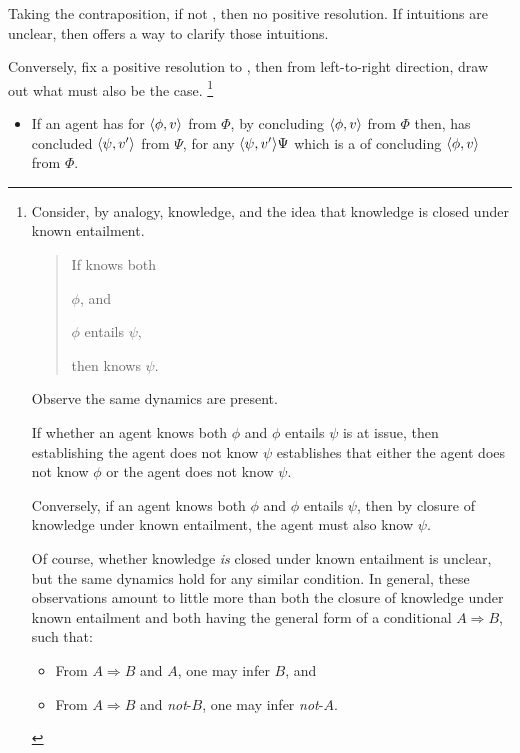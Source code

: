 \begin{note}
  Taking the contraposition, if not \iCS{}, then no positive resolution.
  If intuitions are unclear, then \iCS{} offers a way to clarify those intuitions.

  Conversely, fix a positive resolution to \qzs{}, then from left-to-right direction, draw out what must also be the case.%
  \footnote{
    Consider, by analogy, knowledge, and the idea that knowledge is closed under known entailment.
    \begin{quote}
      If \vAgent{} knows both
      \begin{enumerate*}[label=(\roman*)]
      \item \(\phi\), and
      \item \(\phi\) entails \(\psi\),
      \end{enumerate*}
      then \vAgent{} knows \(\psi\).
    \end{quote}
    Observe the same dynamics are present.

    If whether an agent knows both \(\phi\) and \(\phi\) entails \(\psi\) is at issue, then establishing the agent does not know \(\psi\) establishes that either the agent does not know \(\phi\) or the agent does not know \(\psi\).

    Conversely, if an agent knows both \(\phi\) and \(\phi\) entails \(\psi\), then by closure of knowledge under known entailment, the agent must also know \(\psi\).

    Of course, whether knowledge \emph{is} closed under known entailment is unclear, but the same dynamics hold for any similar condition.
    In general, these observations amount to little more than both the closure of knowledge under known entailment and \iCS{} both having the general form of a conditional \(A \Rightarrow B\), such that:
    \begin{itemize}
    \item
      From \(A \Rightarrow B\) and \(A\), one may infer \(B\), and
    \item
      From \(A \Rightarrow B\) and \emph{not}-\(B\), one may infer \emph{not}-\(A\).
    \end{itemize}
  }

  \begin{itemize}
  \item
    If an agent has \csVed{} for \(\langle \phi, v \rangle\) from \(\Phi\), by concluding \(\langle \phi, v \rangle\) from \(\Phi\) then, has concluded \(\langle \psi, v' \rangle\) from \(\Psi\), for any \(\langle \psi, v' \rangle{\Psi}\) which is a \requ{} of concluding \(\langle \phi, v \rangle\) from \(\Phi\).
  \end{itemize}


\end{note}
